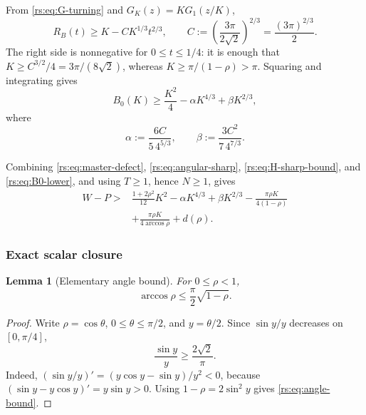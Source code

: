 \documentclass[11pt]{article}
\newtheorem{lemma}[theorem]{Lemma}
\theoremstyle{remark}
\begin{document}
From \eqref{rs:eq:G-turning} and $G_K(z)=KG_1(z/K)$,
\begin{equation}
 R_B(t)\geq K-C K^{1/3}t^{2/3},
 \qquad
 C:=\left(\frac{3\pi}{2\sqrt2}\right)^{2/3}
   =\frac{(3\pi)^{2/3}}2.
 \label{rs:eq:ball-inverse}
\end{equation}
The right side is nonnegative for $0\leq t\leq1/4$: it is enough that
$K\geq C^{3/2}/4=3\pi/(8\sqrt2)$, whereas
$K\geq\pi/(1-\rho)>\pi$.  Squaring and integrating gives
\begin{equation}
 B_0(K)\geq\frac{K^2}{4}-\alpha K^{4/3}+\beta K^{2/3},
 \label{rs:eq:B0-lower}
\end{equation}
where
\begin{equation}
 \alpha:=\frac{6C}{5\,4^{5/3}},
 \qquad
 \beta:=\frac{3C^2}{7\,4^{7/3}}.
 \label{rs:eq:alpha-beta}
\end{equation}

Combining \eqref{rs:eq:master-defect},
\eqref{rs:eq:angular-sharp}, \eqref{rs:eq:H-sharp-bound}, and
\eqref{rs:eq:B0-lower}, and using $T\geq1$, hence $N\geq1$, gives
\begin{equation}
 \begin{aligned}
 W-P>{}&\frac{1+2\rho^2}{12}K^2
 -\alpha K^{4/3}+\beta K^{2/3}
 -\frac{\pi\rho K}{4(1-\rho)}\\
 &+\frac{\pi\rho K}{4\arccos\rho}+d(\rho).
 \end{aligned}
 \label{rs:eq:pre-scalar-gap}
\end{equation}

\subsubsection*{Exact scalar closure}

\begin{lemma}[Elementary angle bound]
\label{rs:lem:angle}
For $0\leq\rho<1$,
\begin{equation}
 \arccos\rho\leq\frac\pi2\sqrt{1-\rho}.
 \label{rs:eq:angle-bound}
\end{equation}
\end{lemma}

\begin{proof}
Write $\rho=\cos\theta$, $0\leq\theta\leq\pi/2$, and
$y=\theta/2$.  Since $\sin y/y$ decreases on $[0,\pi/4]$,
\[
 \frac{\sin y}{y}\geq\frac{2\sqrt2}{\pi}.
\]
Indeed,
$(\sin y/y)'=(y\cos y-\sin y)/y^2<0$, because
$(\sin y-y\cos y)'=y\sin y>0$.
Using $1-\rho=2\sin^2y$ gives \eqref{rs:eq:angle-bound}.
\end{proof}
\end{document}
